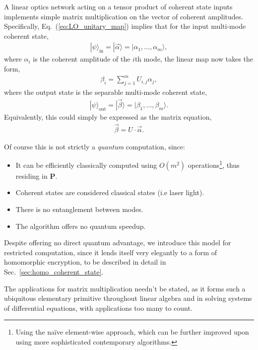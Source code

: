 \documentclass[aps,rmp,twocolumn,amsmath,amssymb,nofootinbib,superscriptaddress,longbibliography,floatfix,table-of-contents,eqsecnum]{revtex4-1}
\newcommand{\ket}[1]{|#1\rangle}
\begin{document}
A linear optics network acting on a tensor product of coherent state inputs implements simple matrix multiplication on the vector of coherent amplitudes. Specifically, Eq.~(\ref{eq:LO_unitary_map}) implies that for the input multi-mode coherent state,
\begin{align}
\ket{\psi}_\text{in} = \ket{\vec\alpha} = \ket{\alpha_1,\dots,\alpha_m},
\end{align}
where $\alpha_i$ is the coherent amplitude of the $i$th mode, the linear map now takes the form,
\begin{align}
\beta_i = \sum_{j=1}^m U_{i,j} \alpha_j,
\end{align}
where the output state is the separable multi-mode coherent state,
\begin{align}
\ket{\psi}_\text{out} = \ket{\vec\beta} = \ket{\beta_1,\dots,\beta_m}.
\end{align}
Equivalently, this could simply be expressed as the matrix equation,
\begin{align}
\vec{\beta} = U\cdot\vec{\alpha}.
\end{align}

Of course this is not strictly a \textit{quantum} computation, since:
\begin{itemize}
\item It can be efficiently classically computed using $O(m^2)$ operations\footnote{Using the na\"ive element-wise approach, which can be further improved upon using more sophisticated contemporary algorithms.}, thus residing in \textbf{P}.
\item Coherent states are considered classical states (i.e laser light).
\item There is no entanglement between modes.
\item The algorithm offers no quantum speedup.
\end{itemize}

Despite offering no direct quantum advantage, we introduce this model for restricted computation, since it lends itself very elegantly to a form of homomorphic encryption, to be described in detail in Sec.~\ref{sec:homo_coherent_state}.

The applications for matrix multiplication needn't be stated, as it forms such a ubiquitous elementary primitive throughout linear algebra and in solving systems of differential equations, with applications too many to count.

%
%
\end{document}

